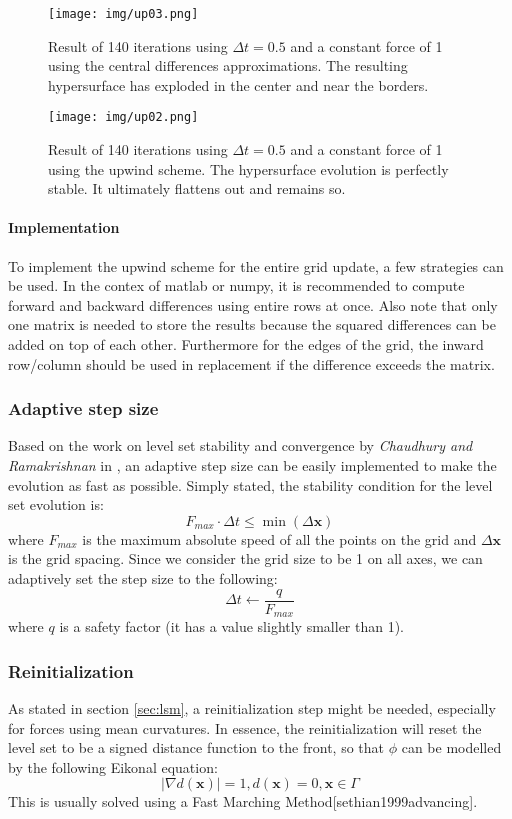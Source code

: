 \documentclass{article}
\begin{document}
\begin{figure}[H]
  \centering
  \texttt{[image: img/up03.png]}
  \caption{Result of 140 iterations using $\Delta t = 0.5$ and a constant force
  of 1 using the central differences approximations. The resulting hypersurface
  has exploded in the center and near the borders.}    
\end{figure}

\begin{figure}[H]
  \centering
  \texttt{[image: img/up02.png]}
  \caption{Result of 140 iterations using $ \Delta t = 0.5$ and a constant force
  of 1 using the upwind scheme. The hypersurface evolution is perfectly stable.
  It ultimately flattens out and remains so.}    
\end{figure}

\paragraph{Implementation}
To implement the upwind scheme for the entire grid
update, a few strategies can be used. In the contex of matlab or numpy, it is
recommended to compute forward and backward differences using entire rows at
once. Also note that only one matrix is needed to store the results because the
squared differences can be added on top of each other.  Furthermore for the
edges of the grid, the inward row/column should be used in replacement if the
difference exceeds the matrix.

\subsubsection{Adaptive step size}
Based on the work on level set stability and convergence by \textit{Chaudhury
and Ramakrishnan} in \cite{chaudhury2007stability}, an adaptive step size can be
easily implemented to make the evolution as fast as possible. Simply stated, the
stability condition for the level set evolution is:
\[
F_{max} \cdot \Delta t \le \min(\Delta \mathbf{x})
\]
where $F_{max}$ is the maximum absolute speed of all the points on the grid and
$\Delta \mathbf{x}$ is the grid spacing. Since we consider the grid size to be
1 on all axes, we can adaptively set the step size to the following:
\[
\Delta t \leftarrow \frac{q}{F_{max}}
\]
where $q$ is a safety factor (it has a value slightly smaller than 1).


\subsubsection{Reinitialization}
As stated in section \ref{sec:lsm}, a reinitialization step might be needed,
especially for forces using mean curvatures. In essence, the reinitialization
will reset the level set to be a signed distance function to the front, so that
$\phi$ can be modelled by the following Eikonal equation:
\[
| \nabla d(\mathbf{x}) | = 1, d(\mathbf{x}) = 0, \mathbf{x} \in \Gamma
\]
This is usually solved using a Fast Marching Method[sethian1999advancing].
\end{document}
